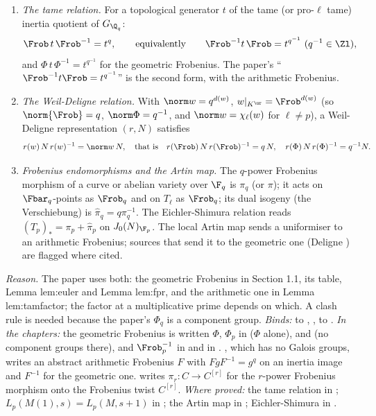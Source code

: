 \begin{convention}
\begin{enumerate}[label=(\alph*)]
geometric Frobenius for $L$-factors and call it $\Frob_p$.
\item \emph{The tame relation.} For a topological generator $t$ of the tame (or pro-$\ell$ tame) inertia quotient of $G_{\Q_q}$:
\[
\Frob\,t\,\Frob^{-1}=t^{q},\qquad\text{equivalently}\qquad\Frob^{-1}t\,\Frob=t^{q^{-1}}\ (q^{-1}\in\Zl),
\]
and $\Phi\,t\,\Phi^{-1}=t^{q^{-1}}$ for the geometric Frobenius.
The paper's ``$\Frob^{-1}t\Frob=t^{q^{-1}}$'' is the second form, with the arithmetic Frobenius.
\item \emph{The Weil-Deligne relation.} With $\norm w=q^{d(w)}$, $w|_{K^{\ur}}=\Frob^{d(w)}$ (so $\norm{\Frob}=q$, $\norm\Phi=q^{-1}$, and
$\norm w=\chi_\ell(w)$ for $\ell\ne p$), a Weil-Deligne representation $(r,N)$ satisfies
\[
r(w)\,N\,r(w)^{-1}=\norm w\,N,\quad\text{that is}\quad r(\Frob)\,N\,r(\Frob)^{-1}=q\,N,\quad r(\Phi)\,N\,r(\Phi)^{-1}=q^{-1}N.
\]
\item \emph{Frobenius endomorphisms and the Artin map.} The $q$-power Frobenius morphism of a curve or abelian variety over $\F_q$
is $\pi_q$ (or $\pi$); it acts on $\Fbar_q$-points as $\Frob_q$ and on $T_\ell$ as $\Frob_q$; its dual isogeny (the Verschiebung) is
$\hat\pi_q=q\pi_q^{-1}$. The Eichler-Shimura relation reads $(T_p)_*=\pi_p+\hat\pi_p$ on $J_0(N)_{\F_p}$. The local Artin map sends a
uniformiser to an arithmetic Frobenius; sources that send it to the geometric one (Deligne \cite{Deligne73}) are flagged where
cited.
\end{enumerate}
\end{convention}

\noindent\emph{Reason.} The paper uses both: the geometric Frobenius in Section 1.1, its table, Lemma lem:euler and
Lemma lem:fpr, and the arithmetic one in Lemma lem:tamfactor; the factor at a multiplicative prime depends on which. A clash rule is
needed because the paper's $\Phi_q$ is a component group. \emph{Binds:}  to ,
,  to . \emph{In the chapters:} the geometric Frobenius is written $\Phi$,
$\Phi_p$ in  ($\Phi$ alone),  and  (no component groups there), and
$\Frob_p^{-1}$ in 
and in . , which has no Galois groups, writes an abstract arithmetic Frobenius $F$ with
$FgF^{-1}=g^q$ on an inertia image and $F^{-1}$ for the geometric one.  writes $\pi_r\colon C\to C^{[r]}$ for the
$r$-power Frobenius morphism onto the Frobenius twist $C^{[r]}$. \emph{Where proved:} the tame relation in ;
$L_p(M(1),s)=L_p(M,s+1)$ in ; the Artin map in ; Eichler-Shimura in .

